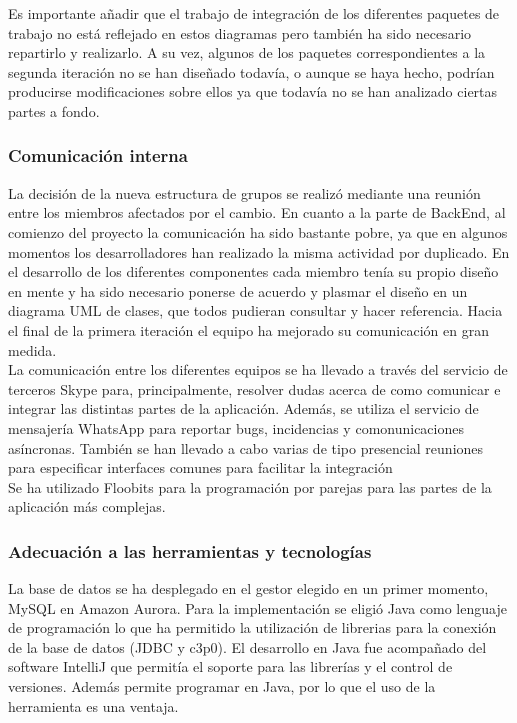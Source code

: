 Es importante añadir que el trabajo de integración de los diferentes paquetes de trabajo no está reflejado en estos diagramas pero también ha sido necesario repartirlo y realizarlo. A su vez, algunos de los paquetes correspondientes a la segunda iteración no se han diseñado todavía, o aunque se haya hecho, podrían producirse modificaciones sobre ellos ya que todavía no se han analizado ciertas partes a fondo.
\subsubsection{Comunicación interna}
La decisión de la nueva estructura de grupos se realizó mediante una reunión entre los miembros afectados por el cambio.
En cuanto a la parte de BackEnd, al comienzo del proyecto la comunicación ha sido bastante pobre, ya que en algunos momentos los desarrolladores han realizado la misma actividad por duplicado. En el desarrollo de los diferentes componentes cada miembro tenía su propio diseño en mente y ha sido necesario ponerse de acuerdo y plasmar el diseño en un diagrama UML de clases, que todos pudieran consultar y hacer referencia. Hacia el final de la primera iteración el equipo ha mejorado su comunicación en gran medida.
\\
La comunicación entre los diferentes equipos se ha llevado a través del servicio de terceros Skype para, principalmente, resolver dudas acerca de como comunicar e integrar las distintas partes de la aplicación. Además, se utiliza el servicio de mensajería WhatsApp para reportar bugs, incidencias y comonunicaciones asíncronas. También se han llevado a cabo varias de tipo presencial reuniones para especificar interfaces comunes para facilitar la integración
\\
Se ha utilizado Floobits para la programación por parejas para las partes de la aplicación más complejas.

\subsubsection{Adecuación a las herramientas y tecnologías}
La base de datos se ha desplegado en el gestor elegido en un primer momento, MySQL en Amazon Aurora. Para la implementación se eligió Java como lenguaje de programación lo que ha permitido la utilización de librerias para la conexión de la base de datos (JDBC y c3p0). El desarrollo en Java fue acompañado del software IntelliJ que permitía el soporte para las librerías y el control de versiones. Además permite programar en Java, por lo que el uso de la herramienta es una ventaja.
\\

